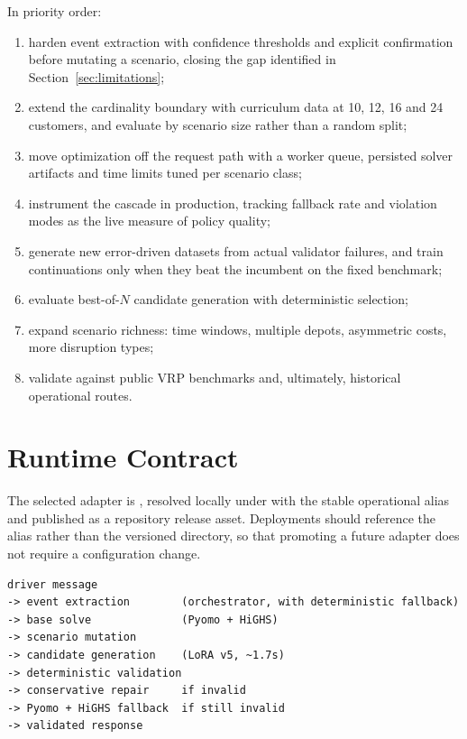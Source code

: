 \documentclass[11pt,a4paper]{article}
\begin{document}
In priority order:

\begin{enumerate}
  \item harden event extraction with confidence thresholds and explicit confirmation before mutating
        a scenario, closing the gap identified in Section~\ref{sec:limitations};
  \item extend the cardinality boundary with curriculum data at 10, 12, 16 and 24 customers, and
        evaluate by scenario size rather than a random split;
  \item move optimization off the request path with a worker queue, persisted solver artifacts and
        time limits tuned per scenario class;
  \item instrument the cascade in production, tracking fallback rate and violation modes as the live
        measure of policy quality;
  \item generate new error-driven datasets from actual validator failures, and train continuations
        only when they beat the incumbent on the fixed benchmark;
  \item evaluate best-of-$N$ candidate generation with deterministic selection;
  \item expand scenario richness: time windows, multiple depots, asymmetric costs, more disruption
        types;
  \item validate against public VRP benchmarks and, ultimately, historical operational routes.
\end{enumerate}

\section{Runtime Contract}

The selected adapter is , resolved locally under
 with the stable operational alias
 and published as a repository release
asset. Deployments should reference the alias rather than the versioned directory, so that promoting
a future adapter does not require a configuration change.

\begin{verbatim}
driver message
-> event extraction        (orchestrator, with deterministic fallback)
-> base solve              (Pyomo + HiGHS)
-> scenario mutation
-> candidate generation    (LoRA v5, ~1.7s)
-> deterministic validation
-> conservative repair     if invalid
-> Pyomo + HiGHS fallback  if still invalid
-> validated response
\end{verbatim}
\end{document}
